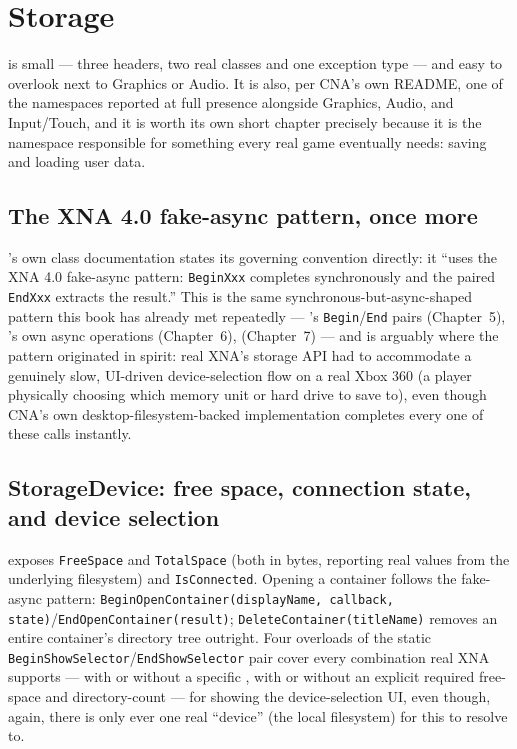 \chapter{Storage}
\label{ch:storage}

 is small --- three headers, two real classes and
one exception type --- and easy to overlook next to Graphics or Audio. It is also, per CNA's
own README, one of the namespaces reported at full presence alongside Graphics, Audio, and
Input/Touch, and it is worth its own short chapter precisely because it is the namespace
responsible for something every real game eventually needs: saving and loading user data.

\section{The XNA 4.0 fake-async pattern, once more}

's own class documentation states its governing convention directly:
it ``uses the XNA 4.0 fake-async pattern: \texttt{BeginXxx} completes synchronously and the
paired \texttt{EndXxx} extracts the result.'' This is the same synchronous-but-async-shaped
pattern this book has already met repeatedly --- 's
\texttt{Begin}/\texttt{End} pairs (Chapter~5), 's own async
operations (Chapter~6),  (Chapter~7) --- and
 is arguably where the pattern originated in spirit: real XNA's
storage API had to accommodate a genuinely slow, UI-driven device-selection flow on a real
Xbox 360 (a player physically choosing which memory unit or hard drive to save to), even
though CNA's own desktop-filesystem-backed implementation completes every one of these calls
instantly.

\section{StorageDevice: free space, connection state, and device selection}

 exposes \texttt{FreeSpace} and \texttt{TotalSpace} (both in bytes,
reporting real values from the underlying filesystem) and \texttt{IsConnected}. Opening a
container follows the fake-async pattern:
\texttt{BeginOpenContainer(displayName, callback, state)}/\texttt{EndOpenContainer(result)};
\texttt{DeleteContainer(titleName)} removes an entire container's directory tree outright.
Four overloads of the static \texttt{BeginShowSelector}/\texttt{EndShowSelector} pair cover
every combination real XNA supports --- with or without a specific ,
with or without an explicit required free-space and directory-count --- for showing the
device-selection UI, even though, again, there is only ever one real ``device'' (the local
filesystem) for this to resolve to.

